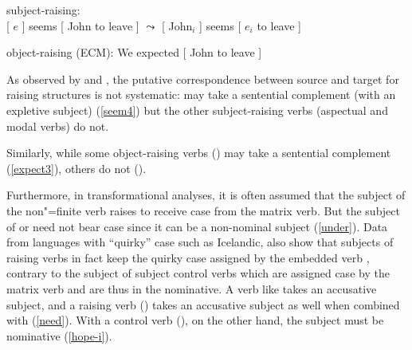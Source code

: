 \documentclass[output=paper
	        ,collection
	        ,collectionchapter
 	        ,biblatex
                ,babelshorthands
                ,newtxmath
                ,draftmode
                ,colorlinks, citecolor=brown
]{langscibook}
\begin{document}
\begin{exe}
\ex  \begin{xlist}
\ex 	subject-raising:\\
{}[ $e$ ] seems [ John to leave ] 
$\leadsto$  
{}[ John$_{i}$ ] seems [ $e_{i}$ to leave ]	

\ex 	object-raising (ECM): We expected [ John to leave ] 	
 \end{xlist}
 \end{exe}

 As observed by \citet{Bresnan1982} and \citet{SagandPollard1991}, the putative correspondence between source and target for raising structures is not systematic:  may take a sentential complement (with an expletive subject) (\ref{seem4}) but the other subject-raising verbs (aspectual and modal verbs) do not. 


\eal
{}
\zl
 
Similarly, while some object-raising verbs () may take a sentential complement (\ref{expect3}), others do not ().
 
\eal
{}
\zl
\eal
{}
\zl

Furthermore, in transformational analyses, it is often assumed that the subject of the non"=finite verb  raises to receive case from the matrix verb.
 But the subject of  or  need not bear case  since it can be a non-nominal subject (\ref{under}).
Data from languages with ``quirky'' case such as Icelandic, also show that subjects of raising verbs in fact keep the quirky case assigned by the embedded verb  \citep{Zaenenetal1985}, contrary to the subject of subject control verbs which are assigned case by the matrix verb and are thus in the nominative. A verb like  takes an accusative subject, and a raising verb () takes an accusative subject as well when combined with  (\ref{need}). With a control verb (), on the other hand, the subject must be nominative (\ref{hope-i}).
\end{document}
